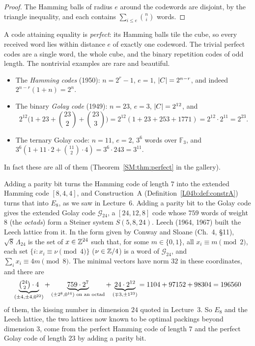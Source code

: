 \begin{proof}
The Hamming balls of radius $e$ around the codewords are disjoint, by the triangle inequality, and each
contains $\sum_{i\le e}\binom ni$ words.
\end{proof}

A code attaining equality is \emph{perfect}: its Hamming balls tile the cube, so every received word lies
within distance $e$ of exactly one codeword. The trivial perfect codes are a single word, the whole cube, and the
binary repetition codes of odd length. The nontrivial examples are rare and beautiful.
\begin{itemize}[nosep]
\item The \emph{Hamming codes} (1950): $n=2^r-1$, $e=1$, $\left\lvert C \right\rvert=2^{n-r}$, and indeed
  $2^{n-r}(1+n)=2^n$.
\item The binary \emph{Golay code} (1949): $n=23$, $e=3$, $\left\lvert C \right\rvert=2^{12}$, and
  \[
    2^{12}\Big(1+23+\binom{23}2+\binom{23}3\Big)=2^{12}(1+23+253+1771)=2^{12}\cdot2^{11}=2^{23}.
  \]
\item The ternary Golay code: $n=11$, $e=2$, $3^6$ words over $\mathbb F_3$, and
  $3^6(1+11\cdot2+\binom{11}2\cdot4)=3^6\cdot243=3^{11}$.
\end{itemize}
In fact these are all of them (Theorem~\ref{SM:thm:perfect} in the gallery).

Adding a parity bit turns the Hamming code of length $7$ into the extended Hamming code $[8,4,4]$, and
Construction~A (Definition~\ref{L04b:def:constrA}) turns that into $E_8$, as we saw in Lecture~6. Adding a
parity bit to the Golay code gives the extended Golay code $\mathcal G_{24}$, a $[24,12,8]$ code whose
$759$ words of weight $8$ (the \emph{octads}) form a Steiner system $S(5,8,24)$. Leech (1964, 1967) built
the Leech lattice from it. In the form given by Conway and Sloane (Ch.~4, \S11), $\sqrt8\,\Lambda_{24}$ is the set
of $x\in\mathbb{Z}^{24}$ such that, for some $m\in\{0,1\}$, all $x_i\equiv m\pmod2$, each set
$\{i:x_i\equiv\nu\pmod4\}$ ($\nu\in\mathbb{Z}/4$) is a word of $\mathcal G_{24}$, and $\sum_ix_i\equiv4m\pmod8$.
The minimal vectors have norm $32$ in these coordinates, and there are
\[
  \underbrace{\tbinom{24}2\cdot4}_{(\pm4,\pm4,0^{22})}+\underbrace{759\cdot2^7}_{(\pm2^8,0^{16})\text{ on an octad}}+\underbrace{24\cdot2^{12}}_{(\mp3,\pm1^{23})}
  =1104+97152+98304=196560
\]
of them, the kissing number in dimension $24$ quoted in Lecture~3. So $E_8$ and the Leech lattice, the two lattices now known to be optimal packings beyond dimension $3$,
come from the perfect Hamming code of length $7$ and the perfect Golay code of length $23$ by adding a
parity bit.

